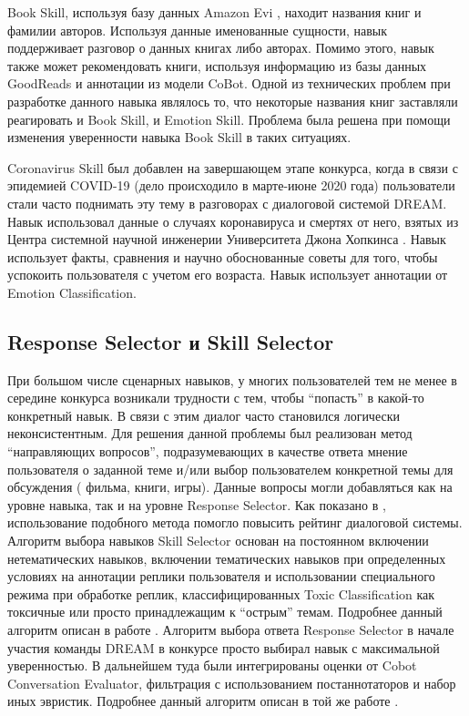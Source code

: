 Book Skill, используя базу данных Amazon Evi \cite{na_website_nds}, находит названия книг и фамилии авторов. Используя данные именованные сущности, навык поддерживает разговор о данных книгах либо авторах. Помимо этого, навык также может рекомендовать книги, используя информацию из базы данных GoodReads \cite{na_website_ndt} и аннотации из модели CoBot. Одной из технических проблем при разработке данного навыка являлось то, что некоторые названия книг заставляли реагировать и Book Skill, и Emotion Skill. Проблема была решена при помощи изменения уверенности навыка Book Skill в таких ситуациях.

Coronavirus Skill был добавлен на завершающем этапе конкурса, когда в связи с эпидемией COVID-19 (дело происходило в марте-июне 2020 года) пользователи стали часто поднимать эту тему в разговорах с диалоговой системой DREAM. Навык использовал данные о случаях коронавируса и смертях от него, взятых из Центра системной научной инженерии Университета Джона Хопкинса \cite{na_website_ndr}. Навык использует факты, сравнения и научно обоснованные советы для того, чтобы успокоить пользователя с учетом его возраста. Навык использует аннотации от Emotion Classification.

\subsection{Response Selector и Skill Selector}

При большом числе сценарных навыков, у многих пользователей тем не менее в середине конкурса возникали трудности с тем, чтобы “попасть” в какой-то конкретный навык. В связи с этим диалог часто становился логически неконсистентным. Для решения данной проблемы был реализован метод “направляющих вопросов”, подразумевающих в качестве ответа мнение пользователя о заданной теме и/или выбор пользователем конкретной темы для обсуждения ( фильма, книги, игры). Данные вопросы могли добавляться как на уровне навыка, так и на уровне Response Selector. Как показано в \cite{dream1}, использование подобного метода помогло повысить рейтинг диалоговой системы.
Алгоритм выбора навыков Skill Selector основан на постоянном включении нетематических навыков, включении тематических навыков при определенных условиях на аннотации реплики пользователя и использовании специального режима при обработке реплик, классифицированных Toxic Classification как токсичные или просто принадлежащим к “острым” темам. Подробнее данный алгоритм описан в работе \cite{dilya_thesis}.
Алгоритм выбора ответа Response Selector в начале участия команды DREAM в конкурсе просто выбирал навык с максимальной уверенностью. В дальнейшем туда были интегрированы оценки от Cobot Conversation Evaluator, фильтрация с использованием постаннотаторов и набор иных эвристик. Подробнее данный алгоритм описан в той же работе \cite{dilya_thesis}.
